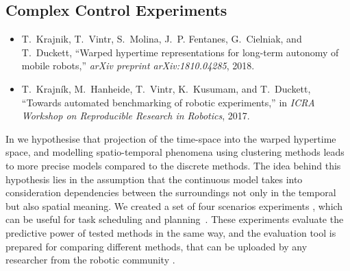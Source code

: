 \subsection{Complex Control Experiments}

\begin{itemize}
    \item T.~Krajnik, T.~Vintr, S.~Molina, J.~P. Fentanes, G.~Cielniak, and T.~Duckett, ``Warped hypertime representations for long-term autonomy of mobile robots,'' \emph{arXiv preprint arXiv:1810.04285}, 2018.
    \item T.~Krajn{\'i}k, M.~Hanheide, T.~Vintr, K.~Kusumam, and T.~Duckett, ``Towards automated benchmarking of robotic experiments,'' in \emph{ICRA Workshop on  Reproducible Research in Robotics}, 2017.
\end{itemize}

In \cite{krajnik2018warped} we hypothesise that projection of the time-space into the warped hypertime space, and modelling spatio-temporal phenomena using clustering methods leads to more precise models compared to the discrete methods.
The idea behind this hypothesis lies in the assumption that the continuous model takes into consideration dependencies between
 the surroundings not only in the temporal \cite{tipaldi2013lifelong,rosen2016towards,kucner2013conditional,krajnik2017fremen} but also spatial meaning.
We created a set of four scenarios experiments \cite{krajnik2017towards}, which can be useful for task scheduling and planning~\cite{mudrova2015integrated}.
These experiments evaluate the predictive power of tested methods in the same way, and the evaluation tool is prepared for
 comparing different methods, that can be uploaded by any researcher from the robotic community \cite{krajnik2017towards}.

